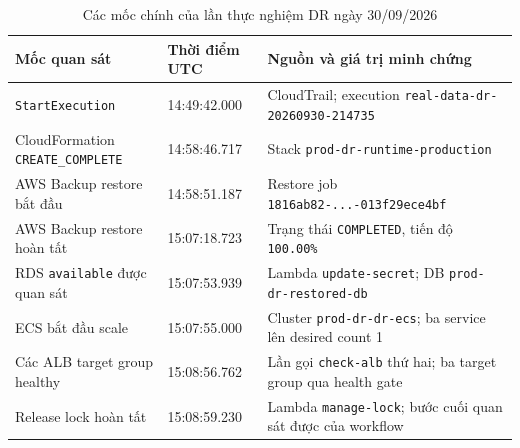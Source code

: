 \begin{table}[H]
\centering
\caption{Các mốc chính của lần thực nghiệm DR ngày 30/09/2026}
\label{tab:experiment-milestones}
\small
\begin{tabularx}{\textwidth}{@{}p{4.2cm}p{3.4cm}X@{}}
\toprule
\textbf{Mốc quan sát} & \textbf{Thời điểm UTC} & \textbf{Nguồn và giá trị minh chứng} \\
\midrule
\texttt{StartExecution} & 14:49:42.000 & CloudTrail; execution \texttt{real-data-dr-20260930-214735} \\
CloudFormation \texttt{CREATE\_COMPLETE} & 14:58:46.717 & Stack \texttt{prod-dr-runtime-production} \\
AWS Backup restore bắt đầu & 14:58:51.187 & Restore job \texttt{1816ab82-...-013f29ece4bf} \\
AWS Backup restore hoàn tất & 15:07:18.723 & Trạng thái \texttt{COMPLETED}, tiến độ \texttt{100.00\%} \\
RDS \texttt{available} được quan sát & 15:07:53.939 & Lambda \texttt{update-secret}; DB \texttt{prod-dr-restored-db} \\
ECS bắt đầu scale & 15:07:55.000 & Cluster \texttt{prod-dr-dr-ecs}; ba service lên desired count 1 \\
Các ALB target group healthy & 15:08:56.762 & Lần gọi \texttt{check-alb} thứ hai; ba target group qua health gate \\
Release lock hoàn tất & 15:08:59.230 & Lambda \texttt{manage-lock}; bước cuối quan sát được của workflow \\
\bottomrule
\end{tabularx}
\end{table}

